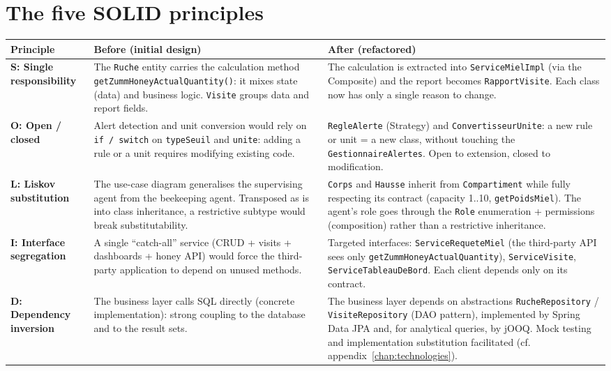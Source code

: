 \section{The five SOLID principles}
\begin{xltabular}{\textwidth}{>{\bfseries}p{2.4cm} p{6cm} X}
\toprule
\textbf{Principle} & \textbf{Before (initial design)} & \textbf{After (refactored)} \\
\midrule
\endhead
S: Single responsibility &
The \texttt{Ruche} entity carries the calculation method
\texttt{getZummHoneyActualQuantity()}: it mixes state (data) and business
logic. \texttt{Visite} groups data and report fields. &
The calculation is extracted into \texttt{ServiceMielImpl} (via the Composite)
and the report becomes \texttt{RapportVisite}. Each class now has only a single
reason to change. \\
O: Open / closed &
Alert detection and unit conversion would rely on \texttt{if / switch} on
\texttt{typeSeuil} and \texttt{unite}: adding a rule or a unit requires
modifying existing code. &
\texttt{RegleAlerte} (Strategy) and \texttt{ConvertisseurUnite}: a new rule or
unit = a new class, without touching the \texttt{GestionnaireAlertes}. Open to
extension, closed to modification. \\
L: Liskov substitution &
The use-case diagram generalises the supervising agent from the beekeeping
agent. Transposed as is into class inheritance, a restrictive subtype would
break substitutability. &
\texttt{Corps} and \texttt{Hausse} inherit from \texttt{Compartiment} while
fully respecting its contract (capacity 1..10, \texttt{getPoidsMiel}). The
agent's role goes through the \texttt{Role} enumeration + permissions
(composition) rather than a restrictive inheritance. \\
I: Interface segregation &
A single ``catch-all'' service (CRUD + visits + dashboards + honey API) would
force the third-party application to depend on unused methods. &
Targeted interfaces: \texttt{ServiceRequeteMiel} (the third-party API sees only
\texttt{getZummHoneyActualQuantity}), \texttt{ServiceVisite},
\texttt{ServiceTableauDeBord}. Each client depends only on its contract. \\
D: Dependency inversion &
The business layer calls SQL directly (concrete implementation): strong
coupling to the database and to the result sets. &
The business layer depends on abstractions \texttt{RucheRepository} /
\texttt{VisiteRepository} (DAO pattern), implemented by Spring Data JPA and, for
analytical queries, by jOOQ. Mock testing and implementation substitution
facilitated (cf. appendix~\ref{chap:technologies}). \\
\bottomrule
\end{xltabular}

